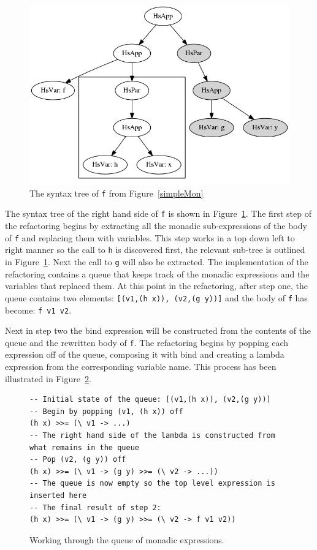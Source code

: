 \begin{figure}[t]
	\begin{center}
		\includegraphics[scale=.5]{graphVis/Chapter6/simpF.png}
	\end{center}
	\caption{The syntax tree of \texttt{f} from Figure~\ref{simpleMon}}
	\label{simpF}
\end{figure}

The syntax tree of the right hand side of \texttt{f} is shown in Figure~\ref{simpF}. The first step of the refactoring begins by extracting all the monadic sub-expressions of the body of \texttt{f} and replacing them with variables. This step works in a top down left to right manner so the call to \texttt{h} is discovered first, the relevant sub-tree is outlined in Figure~\ref{simpF}. Next the call to \texttt{g} will also be extracted. The implementation of the refactoring contains a queue that keeps track of the monadic expressions and the variables that replaced them. At this point in the refactoring, after step one, the queue contains two elements: \texttt{[(v1,(h x)), (v2,(g y))]} and the body of \texttt{f} has become: \texttt{f v1 v2}.

Next in step two the bind expression will be constructed from the contents of the queue and the rewritten body of \texttt{f}. The refactoring begins by popping each expression off of the queue, composing it with bind and creating  a lambda expression from the corresponding variable name. This process has been illustrated in Figure~\ref{queueProc}.

\begin{figure}[t]
\begin{lstlisting}
-- Initial state of the queue: [(v1,(h x)), (v2,(g y))]
-- Begin by popping (v1, (h x)) off
(h x) >>= (\ v1 -> ...)
-- The right hand side of the lambda is constructed from what remains in the queue
-- Pop (v2, (g y)) off
(h x) >>= (\ v1 -> (g y) >>= (\ v2 -> ...))
-- The queue is now empty so the top level expression is inserted here
-- The final result of step 2: 
(h x) >>= (\ v1 -> (g y) >>= (\ v2 -> f v1 v2))
\end{lstlisting}
\caption{Working through the queue of monadic expressions.}
\label{queueProc}
\end{figure}

